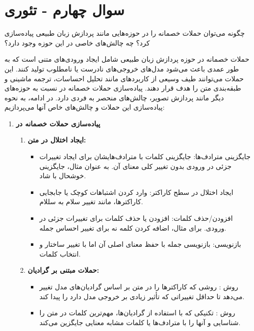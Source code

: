 \section{سوال چهارم - تئوری}
چگونه می‌توان حملات خصمانه را در حوزه‌هایی مانند پردازش زبان طبیعی پیاده‌سازی کرد؟ چه چالش‌های خاصی در این حوزه وجود دارد؟




\begin{qsolve}
حملات خصمانه در حوزه پردازش زبان طبیعی شامل ایجاد ورودی‌های متنی است که به طور عمدی باعث می‌شود مدل‌های  خروجی‌های نادرست یا نامطلوب تولید کنند. این حملات می‌توانند طیف وسیعی از کاربرد‌های  مانند تحلیل احساسات، ترجمه ماشینی و طبقه‌بندی متن را هدف قرار دهند. پیاده‌سازی حملات خصمانه در  نسبت به حوزه‌های دیگر مانند پردازش تصویر، چالش‌های منحصر به فردی دارد. در ادامه، به نحوه پیاده‌سازی این حملات و چالش‌های خاص آنها می‌پردازیم:


\begin{enumerate}
	\item \textbf{پیاده‌سازی حملات خصمانه در }
	\begin{enumerate}
		\item \textbf{ایجاد اختلال در متن:}
		\begin{itemize}
			\item 
جایگزینی مترادف‌ها: جایگزینی کلمات با مترادف‌هایشان برای ایجاد تغییرات جزئی در ورودی بدون تغییر کلی معنای آن. به عنوان مثال، جایگزینی خوشحال با شاد.
			
			\item 
ایجاد اختلال در سطح کاراکتر: وارد کردن اشتباهات کوچک یا جابجایی کاراکترها، مانند تغییر سلام به سللام.
			
			\item 
افزودن/حذف کلمات: افزودن یا حذف کلمات برای تغییرات جزئی در ورودی. برای مثال، اضافه کردن کلمه نه برای تغییر احساس جمله.
			
			\item 
بازنویسی: بازنویسی جمله با حفظ معنای اصلی آن اما با تغییر ساختار و انتخاب کلمات.
		\end{itemize}
		
		
		
		\item \textbf{حملات مبتنی بر گرادیان:}
		\begin{itemize}
			\item 
روش : روشی که کاراکترها را در متن بر اساس گرادیان‌های مدل تغییر می‌دهد تا حداقل تغییراتی که تأثیر زیادی بر خروجی مدل دارد را پیدا کند.

			\item 
روش : تکنیکی که با استفاده از گرادیان‌ها، مهم‌ترین کلمات در متن را شناسایی و آنها را با مترادف‌ها یا کلمات مشابه معنایی جایگزین می‌کند.
		\end{itemize}
		

\end{enumerate}
\end{enumerate}
\end{qsolve}

